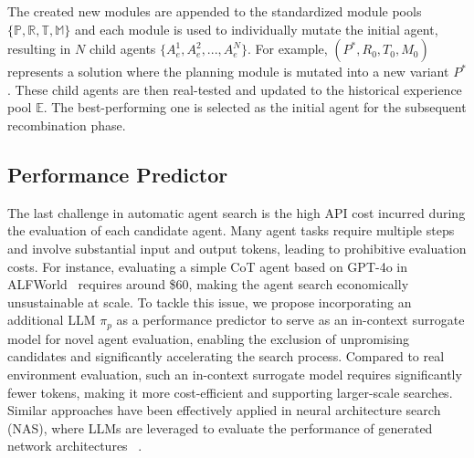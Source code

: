 
The created new modules are appended to the standardized module pools $\{\mathbb{P}, \mathbb{R}, \mathbb{T}, \mathbb{M}\}$ and each module is used to individually mutate the initial agent, resulting in $N$ child agents $\{A_e^1,A_e^2,...,A_e^N\}$.
For example, $(P^*, R_0, T_0, M_0)$ represents a solution where the planning module is mutated into a new variant $P^*$.
These child agents are then real-tested and updated to the historical experience pool $\mathbb{E}$. 
The best-performing one is selected as the initial agent for the subsequent recombination phase.

\subsection{Performance Predictor} \label{section:pp}
The last challenge in automatic agent search is the high API cost incurred during the evaluation of each candidate agent.
Many agent tasks require multiple steps and involve substantial input and output tokens, leading to prohibitive evaluation costs.
For instance, evaluating a simple CoT agent based on GPT-4o in ALFWorld~\citep{shridhar2021alfworld} requires around \$60, making the agent search economically unsustainable at scale.
To tackle this issue, we propose incorporating an additional LLM $\pi_p$ as a performance predictor to serve as an in-context surrogate model for novel agent evaluation, enabling the exclusion of unpromising candidates and significantly accelerating the search process.
Compared to real environment evaluation, such an in-context surrogate model requires significantly fewer tokens, making it more cost-efficient and supporting larger-scale searches.
Similar approaches have been effectively applied in neural architecture search (NAS), where LLMs are leveraged to evaluate the performance of generated network architectures ~\citep{jawahar2023llm,chen2024evoprompting}.

